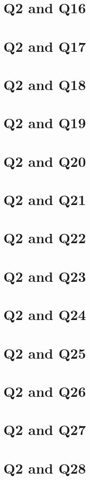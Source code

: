 \documentclass{report}
\begin{document}
\section{Q2 and Q16}\clearpage
\section{Q2 and Q17}\clearpage
\section{Q2 and Q18}\clearpage
\section{Q2 and Q19}\clearpage
\section{Q2 and Q20}\clearpage
\section{Q2 and Q21}\clearpage
\section{Q2 and Q22}\clearpage
\section{Q2 and Q23}\clearpage
\section{Q2 and Q24}\clearpage
\section{Q2 and Q25}\clearpage
\section{Q2 and Q26}\clearpage
\section{Q2 and Q27}\clearpage
\section{Q2 and Q28}\clearpage
\end{document}
